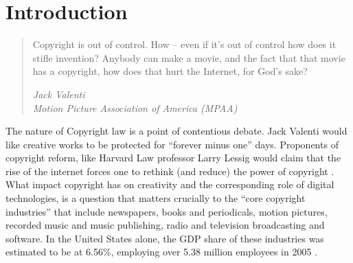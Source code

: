 \documentclass[12pt]{article}
\begin{document}




\newpage

\section{Introduction}

\begin{quote}
Copyright is out of control. How -- even if it’s out of control how does it stifle invention? Anybody can make a movie, and the fact that that movie has a copyright, how does that hurt the Internet, for God’s sake?
\begin{flushright}
\emph{Jack Valenti}\\
\emph{Motion Picture Association of America (MPAA)}
\end{flushright}
\end{quote}

The nature of Copyright law is a point of contentious debate. Jack Valenti would like creative works to be protected for ``forever minus one'' days. Proponents of copyright reform, like Harvard Law professor Larry Lessig would claim that the rise of the internet forces one to rethink (and reduce) the power of copyright \citep{lessig_free_2005}. What impact copyright has on creativity and the corresponding role of digital technologies, is a question that matters crucially to the ``core copyright industries'' that include newspapers, books and periodicals, motion pictures, recorded music and music publishing, radio and television broadcasting and software. In the United States alone, the GDP share of these industries was estimated to be at 6.56\%, employing over 5.38 million employees in 2005 \citep{siwek_copyright_2006}. 
\end{document}
